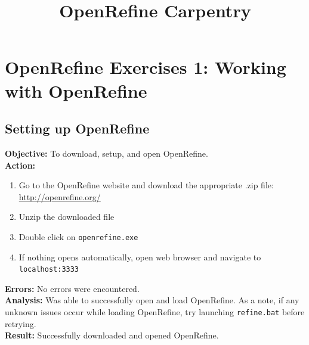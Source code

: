 \documentclass{article}
\begin{document}
\newpage
\title{OpenRefine Carpentry}
\maketitle
\newpage
\section{OpenRefine Exercises 1: Working with OpenRefine}
\subsection{Setting up OpenRefine}
\textbf{Objective:} To download, setup, and open OpenRefine.\\
\textbf{Action:}
\begin{enumerate}
    \item Go to the OpenRefine website and download the appropriate .zip file:\\
    \url{http://openrefine.org/}
    \item Unzip the downloaded file
    \item Double click on \texttt{openrefine.exe}
    \item If nothing opens automatically, open web browser and navigate to\\ \texttt{localhost:3333}
\end{enumerate}
\textbf{Errors:} No errors were encountered.\\
\textbf{Analysis:} Was able to successfully open and load OpenRefine. As a note, if any unknown issues occur while loading OpenRefine, try launching \texttt{refine.bat} before retrying.\\
\textbf{Result:} Successfully downloaded and opened OpenRefine.
%
\end{document}
